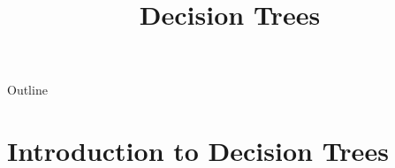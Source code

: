 

%
%


\title[Decision Trees]{Decision Trees}

%

\begin{frame}
  \titlepage
\end{frame}

\begin{frame}{Outline}
  \tableofcontents
\end{frame}

\section{Introduction to Decision Trees}


